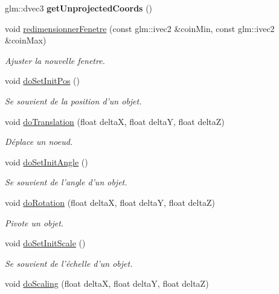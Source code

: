\begin{DoxyCompactItemize}
\item 
\hypertarget{group__inf2990_ga219c55018f92fd2b779c06c7f7c1965e}{glm\-::dvec3 {\bfseries get\-Unprojected\-Coords} ()}\label{group__inf2990_ga219c55018f92fd2b779c06c7f7c1965e}

\item 
void \hyperlink{group__inf2990_ga0a03742a7fa2215a6dd6de99cbfd7b05}{redimensionner\-Fenetre} (const glm\-::ivec2 \&coin\-Min, const glm\-::ivec2 \&coin\-Max)
\begin{DoxyCompactList}\small\item\em Ajuster la nouvelle fenetre. \end{DoxyCompactList}\item 
void \hyperlink{group__inf2990_gacbc609209644f410f7a576a8d1e509d0}{do\-Set\-Init\-Pos} ()
\begin{DoxyCompactList}\small\item\em Se souvient de la position d'un objet. \end{DoxyCompactList}\item 
void \hyperlink{group__inf2990_ga3c29bb5fb742aacf7bea3f62357c4f48}{do\-Translation} (float delta\-X, float delta\-Y, float delta\-Z)
\begin{DoxyCompactList}\small\item\em Déplace un noeud. \end{DoxyCompactList}\item 
void \hyperlink{group__inf2990_gadf7aee8a39d60a055bef3cd05cdda2db}{do\-Set\-Init\-Angle} ()
\begin{DoxyCompactList}\small\item\em Se souvient de l'angle d'un objet. \end{DoxyCompactList}\item 
void \hyperlink{group__inf2990_ga51bb0f8d8e9a6c421ca688e83e10d670}{do\-Rotation} (float delta\-X, float delta\-Y, float delta\-Z)
\begin{DoxyCompactList}\small\item\em Pivote un objet. \end{DoxyCompactList}\item 
void \hyperlink{group__inf2990_gaccc885ec8fc20fa6709a2f74a609ce32}{do\-Set\-Init\-Scale} ()
\begin{DoxyCompactList}\small\item\em Se souvient de l'échelle d'un objet. \end{DoxyCompactList}\item 
void \hyperlink{group__inf2990_gac8decb6e4a3eabfa6baa89022aaab8eb}{do\-Scaling} (float delta\-X, float delta\-Y, float delta\-Z)

\end{DoxyCompactItemize}

